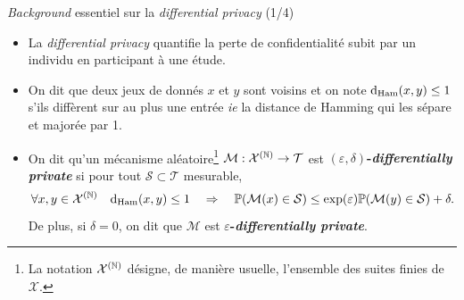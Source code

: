 \documentclass[10pt,serif]{beamer}
\begin{document}
  \begin{frame}{\textit{Background} essentiel sur la \textit{differential privacy} (1/4)}
    \begin{itemize}
      \item La \textit{differential privacy} \cite{10.1007/11681878_14} quantifie la perte de confidentialité subit par un individu en participant à une étude. 

      \item<2->\begin{definition}
          On dit que deux jeux de donnés \(x\) et \(y\) sont voisins et on note \(\mathrm{d}_{\text{Ham}}(x,y) \leq 1\) s'ils diffèrent sur au plus une entrée \textit{ie} la distance de {\sc Hamming} qui les sépare et majorée par 1.
      \end{definition}
       
      
      \item<3->\begin{definition}
          On dit qu'un mécanisme aléatoire\footnote{La notation \(\mathcal X^{(\mathbb{N})}\) désigne, de manière usuelle, l'ensemble des suites finies de \(\mathcal X\).} \(\mathcal M :\mathcal X^{(\mathbb{N})} \to \mathcal T\) est \textbf{\((\varepsilon, \delta)\)-\textit{differentially private}} si pour tout \(\mathcal S \subset \mathcal T \) mesurable, 
          \[
              \forall x,y \in \mathcal X^{(\mathbb{N})} \quad \mathrm{d}_{\text{Ham}}(x,y) \leq 1 \quad \Rightarrow \quad \mathbb P(\mathcal M(x) \in \mathcal S) \leq \exp(\varepsilon)  \mathbb P(\mathcal M(y) \in \mathcal S) + \delta.
          \] 
          De plus, si \(\delta = 0\), on dit que \(\mathcal M\) est \textbf{\(\varepsilon\)-\textit{differentially private}}. 
      \end{definition}
    \end{itemize}
  \end{frame}
\end{document}
